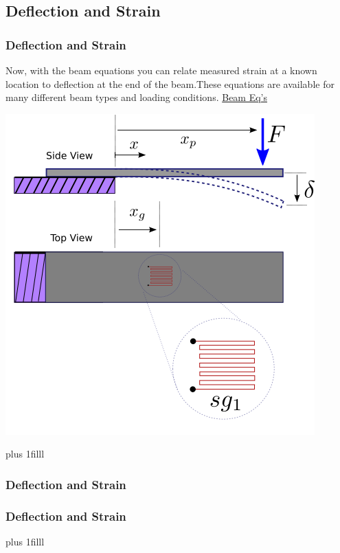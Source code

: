 \documentclass[fleqn]{beamer} %
\newcommand{\sectionIsubsectionIVtitle}{Deflection and Strain}
\newcommand{\btVFill}{\vskip0pt plus 1filll}
\begin{document}
		\subsection{\sectionIsubsectionIVtitle}\label{sectionIsubsectionIV}	

			\begin{frame}
				\frametitle{\sectionIsubsectionIVtitle} \scriptsize
				\bigskip

				Now, with the beam equations you can relate measured strain at a known location to deflection at the end of the beam.These equations are available for many different beam types and loading conditions. {\tiny \href{https://mechanicalc.com/reference/beam-deflection-tables}{{\BL Beam Eq's}}}  \vspc

				\includegraphics[scale=.4]{images/axial_gaged_beam.png}

			
				\btVFill
			

			\end{frame}

			\begin{frame}
				\frametitle{\sectionIsubsectionIVtitle} \scriptsize


			\end{frame}


			\begin{frame}
				\frametitle{\sectionIsubsectionIVtitle} \scriptsize

				\bigskip


				\btVFill

										
			\end{frame}
\end{document}
